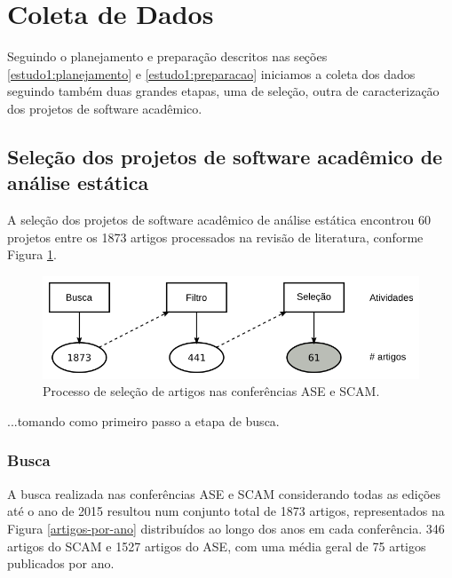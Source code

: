 
\section{Coleta de Dados} \label{estudo1:coleta}

Seguindo o planejamento e preparação descritos nas seções
\ref{estudo1:planejamento} e \ref{estudo1:preparacao} iniciamos a coleta dos
dados seguindo também duas grandes etapas, uma de seleção, outra de
caracterização dos projetos de software acadêmico.

\subsection{Seleção dos projetos de software acadêmico de análise estática} %

A seleção dos projetos de software acadêmico de análise estática encontrou
60 projetos entre os 1873 artigos processados na revisão de literatura, conforme
Figura \ref{revisao-literatura-execucao}.


\begin{figure}[h]
  \center
  \includegraphics[scale=0.4]{imagens/revisao-literatura-execucao.png}
  \caption{Processo de seleção de artigos nas conferências ASE e SCAM.}
  \label{revisao-literatura-execucao}
\end{figure}


...tomando como primeiro passo a etapa de busca.




\subsubsection{Busca}

A busca realizada nas conferências ASE e SCAM considerando todas as edições até
o ano de 2015 resultou num conjunto total de 1873 artigos, representados na
Figura \ref{artigos-por-ano} distribuídos ao longo dos anos em cada conferência.
346 artigos do SCAM e 1527 artigos do ASE,
com uma média geral de 75 artigos publicados por ano. 

